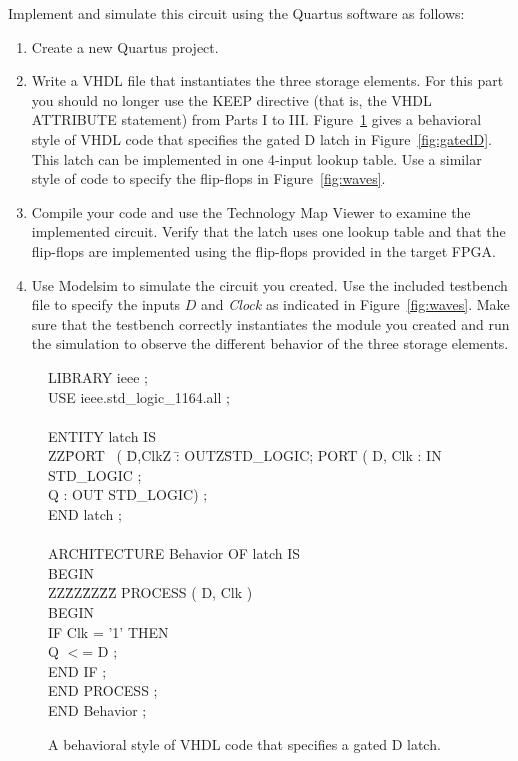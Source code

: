 \documentclass[epsfig,10pt,fullpage]{article}
\begin{document}
Implement and simulate this circuit using the Quartus software as follows:
\begin{enumerate}
\item Create a new Quartus project. 
\item Write a VHDL file that instantiates the three storage elements. For this part you
should no longer use the KEEP directive (that is, the VHDL ATTRIBUTE statement) from Parts I 
to III. Figure~\ref{fig:behave} gives a behavioral style 
of VHDL code that specifies the gated D latch in Figure~\ref{fig:gatedD}.
This latch can be implemented in one 4-input lookup table. Use a similar style of
code to specify the flip-flops in Figure~\ref{fig:waves}.
\item Compile your code and use the Technology Map Viewer to examine the implemented circuit.
Verify that the latch uses one lookup table and that the flip-flops are implemented using
the flip-flops provided in the target FPGA.
\item Use Modelsim to simulate the circuit you created. Use the included testbench file to 
specify the inputs $D$ and {\it Clock} as indicated in Figure~\ref{fig:waves}.
Make sure that the testbench correctly instantiates the module you created and 
run the simulation to observe the different behavior of the three storage elements.
\end{enumerate}

\begin{figure}[H]
\begin{center}
\begin{minipage}[t]{12.5 cm}
\begin{tabbing}
LIBRARY ieee ; \\
USE ieee.std\_logic\_1164.all ; \\
~\\
ENTITY latch IS \\
ZZ\=PORT ~( \=D,ClkZ \=: OUTZ\=STD\_LOGIC;\kill
\>PORT (	\>D, Clk \>: IN \>STD\_LOGIC ; \\
\>\>Q \>: OUT \>STD\_LOGIC) ; \\
END latch ;\\
~\\
ARCHITECTURE Behavior OF latch IS    \\
BEGIN\\
ZZ\=ZZ\=ZZ\=ZZ\=\kill
\>PROCESS ( D, Clk ) \\
\>BEGIN\\
\>\>IF Clk = '1' THEN \\
\>\>\>Q $<$= D ; \\
\>\>END IF ; \\
\>END PROCESS ; \\
END Behavior ;\\
\end{tabbing}
\end{minipage}
\end{center}
\caption{A behavioral style of VHDL code that specifies a gated D latch.}
\label{fig:behave}
\end{figure}
\end{document}
